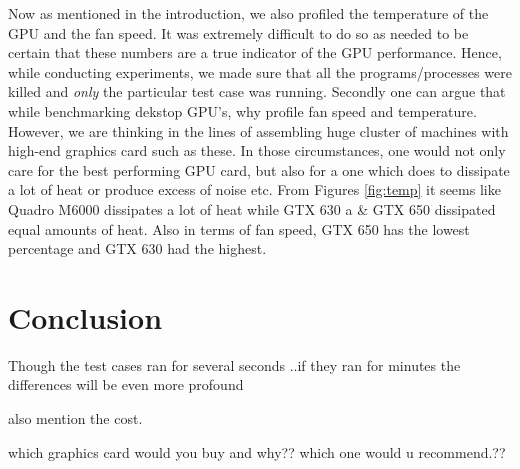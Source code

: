 \documentclass[paper=a4, fontsize=11pt]{scrartcl}
\numberwithin{equation}{section}		%
\numberwithin{figure}{section}			%
\numberwithin{table}{section}				%
\begin{document}
Now as mentioned in the introduction, we also profiled the temperature of the GPU and the fan speed. It was extremely difficult to do so as needed to be certain that these numbers are a true indicator of the GPU performance. Hence, while conducting experiments, we made sure that all the programs/processes were killed and \emph{only} the particular test case was running. Secondly one can argue that while benchmarking dekstop GPU's, why profile fan speed and temperature. However, we are thinking in the lines of assembling huge cluster of machines with high-end graphics card such as these. In those circumstances, one would not only care for the best performing GPU card, but also for a one which does to dissipate a lot of heat or produce excess of noise etc. From Figures \ref{fig:temp} it seems like Quadro M6000 dissipates a lot of heat while GTX 630 a \& GTX 650 dissipated equal amounts of heat. Also in terms of fan speed, GTX 650 has the lowest percentage and GTX 630 had the highest.


\newpage
\section{Conclusion}

Though the test cases ran for several seconds ..if they ran for minutes the differences will be even more profound

also mention the cost.

which graphics card would you buy and why?? which one would u recommend.??
\end{document}
